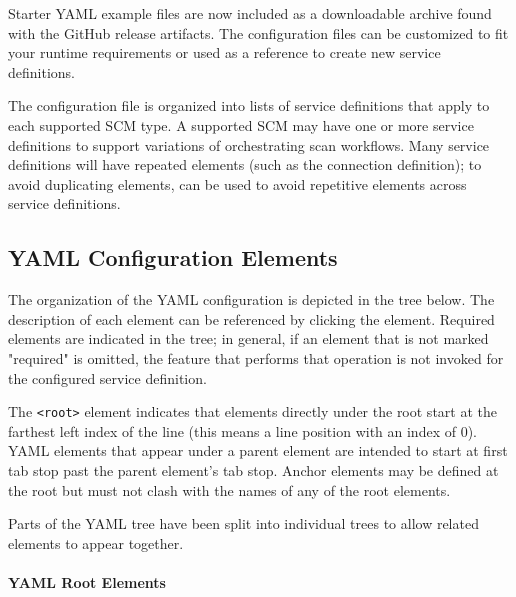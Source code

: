 Starter YAML example files are now included as a downloadable archive found with the \cxoneflow GitHub
release artifacts.  The configuration files can be customized to fit your runtime requirements or used
as a reference to create new service definitions.

The configuration file is organized into lists of service definitions that apply to each supported
SCM type.  A supported SCM may have one or more service definitions to support variations of
orchestrating scan workflows.  Many service definitions will have repeated elements (such as
the \cxone connection definition); to avoid duplicating elements, 
can be used to avoid repetitive elements across service definitions.  


\subsection{YAML Configuration Elements}\label{sec:yaml-config}

The organization of the YAML configuration is depicted in the tree below.  The description of each element
can be referenced by clicking the element.  Required elements are indicated in the tree; in general, if an
element that is not marked "required" is omitted, the feature that performs that operation is not invoked
for the configured service definition.

The \texttt{<root>} element indicates that elements directly under the root start at the farthest
left index of the line (this means a line position with an index of 0).  YAML elements that appear
under a parent element are intended to start at first tab stop past the parent element's tab stop.
Anchor elements may be defined at the root but must not clash with the names of any of the root elements.

Parts of the YAML tree have been split into individual trees to allow related elements to appear together.

\paragraph{YAML Root Elements}\label{sec:yaml-root}

\noindent\\



